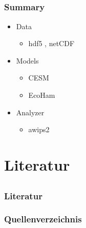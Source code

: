 \documentclass[compress]{beamer}
\begin{document}
\subsection*{}

\begin{frame}
	\frametitle{Summary}

	\begin{itemize}
		\item Data
		
		\begin{itemize}
			\item hdf5 , netCDF
		\end{itemize}
		
		\item Models
		\begin{itemize}
			\item CESM
			\item EcoHam
		\end{itemize}
		\item Analyzer
		\begin{itemize}
		    \item awips2
		\end{itemize}
	\end{itemize}
\end{frame}

\section{Literatur}
\subsection*{}

\begin{frame}[allowframebreaks]
	\frametitle{Literatur}
    \frametitle{Quellenverzeichnis}

	
	
\end{frame}
\end{document}
